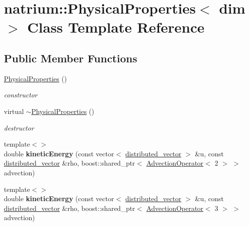 \hypertarget{classnatrium_1_1PhysicalProperties}{
\section{natrium::PhysicalProperties$<$ dim $>$ Class Template Reference}
\label{classnatrium_1_1PhysicalProperties}
}
\subsection*{Public Member Functions}
\begin{DoxyCompactItemize}
\item 
\hypertarget{classnatrium_1_1PhysicalProperties_a5047491de09441e2aae00f6ba838f99e}{
\hyperlink{classnatrium_1_1PhysicalProperties_a5047491de09441e2aae00f6ba838f99e}{PhysicalProperties} ()}
\label{classnatrium_1_1PhysicalProperties_a5047491de09441e2aae00f6ba838f99e}

\begin{DoxyCompactList}\small\item\em constructor \item\end{DoxyCompactList}\item 
\hypertarget{classnatrium_1_1PhysicalProperties_a1089bbb66f56e8c31cdb2908d5b08757}{
virtual \hyperlink{classnatrium_1_1PhysicalProperties_a1089bbb66f56e8c31cdb2908d5b08757}{$\sim$PhysicalProperties} ()}
\label{classnatrium_1_1PhysicalProperties_a1089bbb66f56e8c31cdb2908d5b08757}

\begin{DoxyCompactList}\small\item\em destructor \item\end{DoxyCompactList}\item 
\hypertarget{classnatrium_1_1PhysicalProperties_a7d649be1cf509d35b5771926dc54f622}{
{\footnotesize template$<$$>$ }\\double {\bfseries kineticEnergy} (const vector$<$ \hyperlink{namespacenatrium_a903d2b92917f582f2ff05f52160ab811}{distributed\_\-vector} $>$ \&u, const \hyperlink{namespacenatrium_a903d2b92917f582f2ff05f52160ab811}{distributed\_\-vector} \&rho, boost::shared\_\-ptr$<$ \hyperlink{classnatrium_1_1AdvectionOperator}{AdvectionOperator}$<$ 2 $>$ $>$ advection)}
\label{classnatrium_1_1PhysicalProperties_a7d649be1cf509d35b5771926dc54f622}

\item 
\hypertarget{classnatrium_1_1PhysicalProperties_aea561f3e9b80571b1cdecb66425365cf}{
{\footnotesize template$<$$>$ }\\double {\bfseries kineticEnergy} (const vector$<$ \hyperlink{namespacenatrium_a903d2b92917f582f2ff05f52160ab811}{distributed\_\-vector} $>$ \&u, const \hyperlink{namespacenatrium_a903d2b92917f582f2ff05f52160ab811}{distributed\_\-vector} \&rho, boost::shared\_\-ptr$<$ \hyperlink{classnatrium_1_1AdvectionOperator}{AdvectionOperator}$<$ 3 $>$ $>$ advection)}
\label{classnatrium_1_1PhysicalProperties_aea561f3e9b80571b1cdecb66425365cf}


\end{DoxyCompactItemize}
